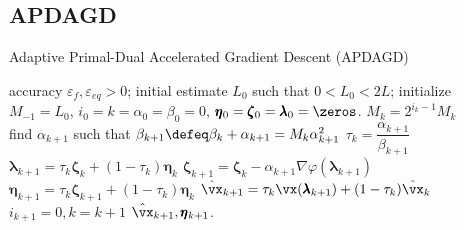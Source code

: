 \subsection{APDAGD}
\begin{algorithm}
    \caption{Adaptive Primal-Dual Accelerated Gradient Descent (APDAGD) \citep[Algorithm 3]{Dvurechensky-2018-Computational}}
    \label{alg:APDAGD}
    \begin{algorithmic}[1]
        \REQUIRE accuracy $\varepsilon_f, \varepsilon_{eq} > 0$; initial estimate $L_0$ such that $0 < L_0 < 2L$; initialize $M_{-1} = L_0$, $i_0 = k = \alpha_0 = \beta_0 = 0$, $\pmb{\eta}_0 = \pmb{\zeta}_0 = \pmb{\lambda}_0 = \zeros$. 
                \STATE \( M_k = 2^{i_k-1} M_k\) \\
                find $\alpha_{k+1}$ such that $\beta_{k+1} \defeq \beta_{k} + \alpha_{k+1} = M_k \alpha_{k+1}^2$
                \STATE \( \tau_k = \dfrac{\alpha_{k+1}}{\beta_{k+1}} \) 
                \STATE \( \pmb{\lambda}_{k+1} = \tau_k \pmb{\zeta}_k + (1-\tau_k)\pmb{\eta}_k  \) 
                \STATE \( \pmb{\zeta}_{k+1} = \pmb{\zeta}_{k} - \alpha _{k+1} \nabla \varphi(\pmb{\lambda}_{k+1})\)
                \STATE \( \pmb{\eta}_{k+1} = \tau_k \pmb{\zeta}_{k+1} + (1-\tau_k) \pmb{\eta}_k \)
            \ENDWHILE 
            \STATE \( \hat{\vx}_{k+1} = \tau_k \vx (\pmb{\lambda}_{k+1}) + (1-\tau_k)\hat{\vx}_k \)
            \STATE \( i_{k+1} = 0, k = k+1\)
        \ENDWHILE
        \ENSURE \(\hat{\vx}_{k+1}, \pmb{\eta}_{k+1}\).
    \end{algorithmic}
\end{algorithm}

